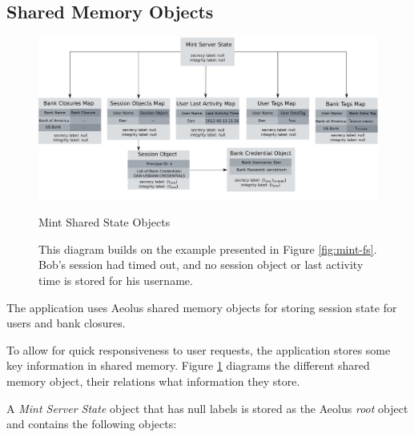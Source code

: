 \subsection{Shared Memory Objects}
\label{sec:mint-smo}

\begin{figure}[h]
\centering
\includegraphics[width=\textwidth,height=\textheight,keepaspectratio]{figures/mint-shared-state}
\caption*{Mint Shared State Objects}
\caption{This diagram builds on the example presented in Figure \ref{fig:mint-fs}. Bob's session had timed out, and no session object or last activity time is stored for his username.}
\label{fig:mint-ss}
\end{figure}

The application uses Aeolus shared memory objects for storing session state for users and bank closures.

To allow for quick responsiveness to user requests, the application stores some key information in shared memory. Figure \ref{fig:mint-ss} diagrams the different shared memory object, their relations what information they store.

A \emph{Mint Server State} object that has null labels is stored as the Aeolus \emph{root} object and contains the following objects:

